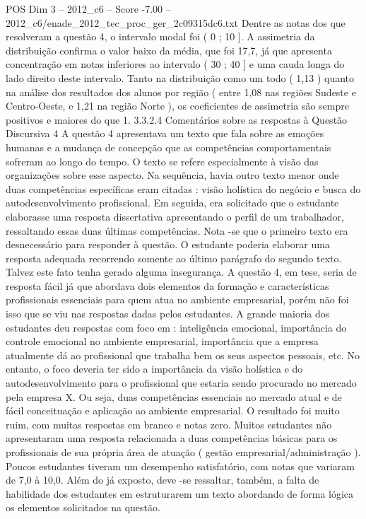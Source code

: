 \begin{textsample}{POS Dim 3 – 2012\_c6 – Score -7.00 – 2012\_c6/enade\_2012\_tec\_proc\_ger\_2c09315dc6.txt}
Dentre as notas dos que resolveram a questão 4, o intervalo modal foi ( 0 ; 10 ].
A assimetria da distribuição confirma o valor baixo da média, que foi 17,7, já que apresenta concentração em notas inferiores ao intervalo ( 30 ; 40 ] e uma cauda longa do lado direito deste intervalo.
Tanto na distribuição como um todo ( 1,13 ) quanto na análise dos resultados dos alunos por região ( entre 1,08 nas regiões Sudeste e Centro-Oeste, e 1,21 na região Norte ), os coeficientes de assimetria são sempre positivos e maiores do que 1. 3.3.2.4 Comentários sobre as respostas à Questão Discursiva 4 A questão 4 apresentava um texto que fala sobre as emoções humanas e a mudança de concepção que as competências comportamentais sofreram ao longo do tempo.
O texto se refere especialmente à visão das organizações sobre esse aspecto.
Na sequência, havia outro texto menor onde duas competências específicas eram citadas : visão holística do negócio e busca do autodesenvolvimento profissional.
Em seguida, era solicitado que o estudante elaborasse uma resposta dissertativa apresentando o perfil de um trabalhador, ressaltando essas duas últimas competências.
Nota -se que o primeiro texto era desnecessário para responder à questão.
O estudante poderia elaborar uma resposta adequada recorrendo somente ao último parágrafo do segundo texto.
Talvez este fato tenha gerado alguma insegurança.
A questão 4, em tese, seria de resposta fácil já que abordava dois elementos da formação e características profissionais essenciais para quem atua no ambiente empresarial, porém não foi isso que se viu nas respostas dadas pelos estudantes.
A grande maioria dos estudantes deu respostas com foco em : inteligência emocional, importância do controle emocional no ambiente empresarial, importância que a empresa atualmente dá ao profissional que trabalha bem os seus aspectos pessoais, etc.
No entanto, o foco deveria ter sido a importância da visão holística e do autodesenvolvimento para o profissional que estaria sendo procurado no mercado pela empresa X.
Ou seja, duas competências essenciais no mercado atual e de fácil conceituação e aplicação ao ambiente empresarial.
O resultado foi muito ruim, com muitas respostas em branco e notas zero.
Muitos estudantes não apresentaram uma resposta relacionada a duas competências básicas para os profissionais de sua própria área de atuação ( gestão empresarial/administração ).
Poucos estudantes tiveram um desempenho satisfatório, com notas que variaram de 7,0 à 10,0.
Além do já exposto, deve -se ressaltar, também, a falta de habilidade dos estudantes em estruturarem um texto abordando de forma lógica os elementos solicitados na questão.

\end{textsample}
